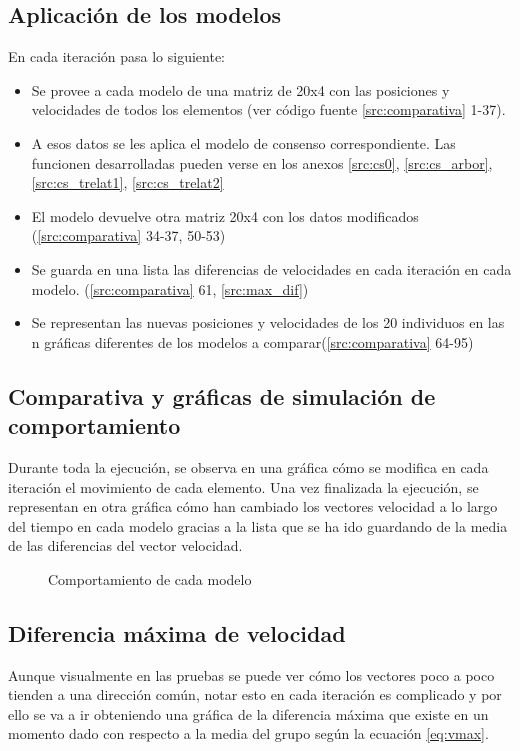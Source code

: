 \subsection{Aplicación de los modelos}\label{s4_2_2}
En cada iteración pasa lo siguiente:
\begin{itemize}
    \item Se provee a cada modelo de una matriz de 20x4 con las posiciones y velocidades de todos los elementos (ver código fuente \ref{src:comparativa} 1-37).
    \item A esos datos se les aplica el modelo de consenso correspondiente. Las funcionen desarrolladas pueden verse en los anexos \ref{src:cs0}, \ref{src:cs_arbor}, \ref{src:cs_trelat1}, \ref{src:cs_trelat2}
    \item El modelo devuelve otra matriz 20x4 con los datos modificados (\ref{src:comparativa} 34-37, 50-53)
    \item Se guarda en una lista las diferencias de velocidades en cada iteración en cada modelo. (\ref{src:comparativa} 61, \ref{src:max_dif})
    \item Se representan las nuevas posiciones y velocidades de los 20 individuos en las n gráficas diferentes de los modelos a comparar(\ref{src:comparativa} 64-95)
\end{itemize}

\subsection{Comparativa y gráficas de simulación de comportamiento}\label{s4_2_3}
Durante toda la ejecución, se observa en una gráfica cómo se modifica en cada iteración el movimiento de cada elemento. 
Una vez finalizada la ejecución, se representan en otra gráfica cómo han cambiado los vectores velocidad a lo largo del tiempo en cada modelo gracias a la lista que se ha ido guardando de la media de las diferencias del vector velocidad. 

\begin{figure}[h]
  \centering
    
  \caption{Comportamiento de cada modelo}
\end{figure}

\subsection{Diferencia máxima de velocidad}\label{s4_2_4}
Aunque visualmente en las pruebas se puede ver cómo los vectores poco a poco tienden a una dirección común, notar esto en cada iteración es complicado y por ello se va a ir obteniendo una gráfica de la diferencia máxima que existe en un momento dado con respecto a la media del grupo según la ecuación \ref{eq:vmax}.

